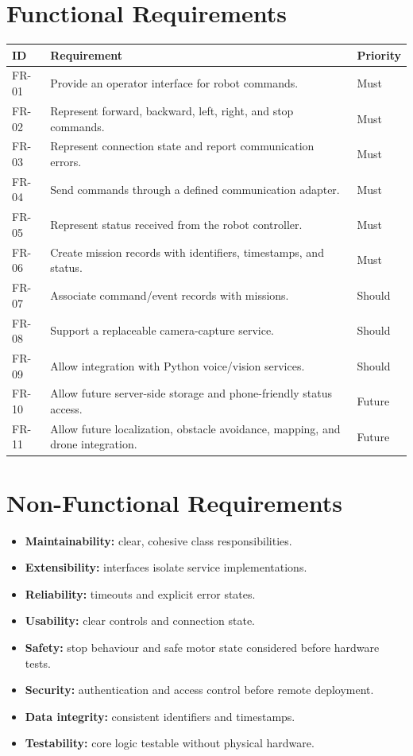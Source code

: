 \documentclass[12pt,a4paper]{article}
\begin{document}
\section{Functional Requirements}
\begin{longtable}{p{1.2cm}p{9cm}p{2cm}}\toprule
ID & Requirement & Priority\\\midrule
FR-01 & Provide an operator interface for robot commands. & Must\\
FR-02 & Represent forward, backward, left, right, and stop commands. & Must\\
FR-03 & Represent connection state and report communication errors. & Must\\
FR-04 & Send commands through a defined communication adapter. & Must\\
FR-05 & Represent status received from the robot controller. & Must\\
FR-06 & Create mission records with identifiers, timestamps, and status. & Must\\
FR-07 & Associate command/event records with missions. & Should\\
FR-08 & Support a replaceable camera-capture service. & Should\\
FR-09 & Allow integration with Python voice/vision services. & Should\\
FR-10 & Allow future server-side storage and phone-friendly status access. & Future\\
FR-11 & Allow future localization, obstacle avoidance, mapping, and drone integration. & Future\\\bottomrule
\end{longtable}

\section{Non-Functional Requirements}
\begin{itemize}
\item \textbf{Maintainability:} clear, cohesive class responsibilities.
\item \textbf{Extensibility:} interfaces isolate service implementations.
\item \textbf{Reliability:} timeouts and explicit error states.
\item \textbf{Usability:} clear controls and connection state.
\item \textbf{Safety:} stop behaviour and safe motor state considered before hardware tests.
\item \textbf{Security:} authentication and access control before remote deployment.
\item \textbf{Data integrity:} consistent identifiers and timestamps.
\item \textbf{Testability:} core logic testable without physical hardware.
\end{itemize}
\end{document}
